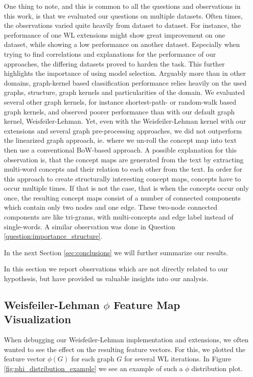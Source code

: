 One thing to note, and this is common to all the questions and observations in this work, is that we evaluated our questions on multiple datasets. Often times, the observations varied quite heavily from dataset to dataset.
For instance, the performance of one WL extensions might show great improvement on one dataset, while showing a low performance on another dataset. 
Especially when trying to find correlations and explanations for the performance of our approaches, the differing datasets proved to harden the task.
This further highlights the importance of using model selection.
Arguably more than in other domains,  graph-kernel based classification performance relies heavily on the used graphs, structure, graph kernels and particularities of the domain.
We evaluated several other graph kernels, for instance shortest-path- or random-walk based graph kernels, and observed poorer performance than with our default graph kernel, Weisfeiler-Lehman.
Yet, even with the Weisfeiler-Lehman kernel with our extensions and several graph pre-processing approaches, we did not outperform the linearized graph approach, ie. where we un-roll the concept map into text then use a conventional BoW-based approach.
A possible explanation for this observation is, that the concept maps are generated from the text by extracting multi-word concepts and their relation to each other from the text.
In order for this approach to create structurally interesting concept maps, concepts have to occur multiple times.
If that is not the case, that is when the concepts occur only once, the resulting concept maps consist of a number of connected components which contain only two nodes and one edge.
These two-node connected components are like tri-grams, with multi-concepts and edge label instead of single-words.
A similar observation was done in Question \ref{question:importance_structure}.

In the next Section \ref{sec:conclusions} we will further summarize our results.

In this section we report observations which are not directly related to our hypothesis, but have provided us valuable insights into our analysis.

\subsection{Weisfeiler-Lehman $\phi$ Feature Map Visualization}
When debugging our Weisfeiler-Lehman implementation and extensions, we often wanted to see the effect on the resulting feature vectors.
For this, we plotted the feature vector $\phi(G)$ for each graph $G$ for several WL iterations.
In Figure \ref{fig:phi_distribution_example} we see an example of such a $\phi$ distribution plot.

